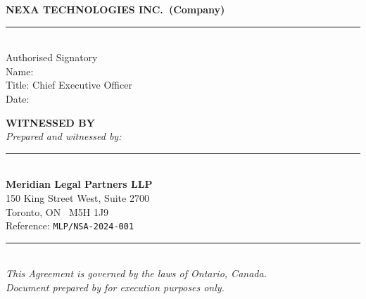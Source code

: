 \noindent
\begin{minipage}[t]{0.47\textwidth}
  \begin{tcolorbox}[notebox, top=10pt, bottom=14pt]
    \textbf{\small NEXA TECHNOLOGIES INC.\ (Company)}\\[6pt]
    \noindent\rule{\linewidth}{0.4pt}\\[2pt]
    {\small Authorised Signatory}\\[2pt]
    {\small\color{NavyMid}Name: \underline{\hspace{4.2cm}}}\\[2pt]
    {\small\color{NavyMid}Title: Chief Executive Officer}\\[2pt]
    {\small\color{NavyMid}Date: \underline{\hspace{4.6cm}}}
  \end{tcolorbox}
\end{minipage}%
\hfill
\begin{minipage}[t]{0.47\textwidth}
  \vspace{0pt}
  \begin{tcolorbox}[goldbox, top=10pt, bottom=14pt]
    \textbf{\small WITNESSED BY}\\[4pt]
    {\small\textit{Prepared and witnessed by:}}\\[6pt]
    \noindent\rule{\linewidth}{0.4pt}\\[2pt]
    {\small\textbf{Meridian Legal Partners LLP}}\\[2pt]
    {\small\color{NavyMid}150 King Street West, Suite 2700}\\
    {\small\color{NavyMid}Toronto, ON \ M5H 1J9}\\
    {\small\color{NavyMid}Reference: \texttt{MLP/NSA-2024-001}}
  \end{tcolorbox}
\end{minipage}

\vspace{1.2cm}

\begin{center}
  \small\color{SlateRule}
  \rule{0.6\textwidth}{0.4pt}\\[4pt]
  \textit{This Agreement is governed by the laws of Ontario, Canada.\\
  Document prepared by \lawfirm{} for execution purposes only.}
\end{center}

\label{LastPage}

